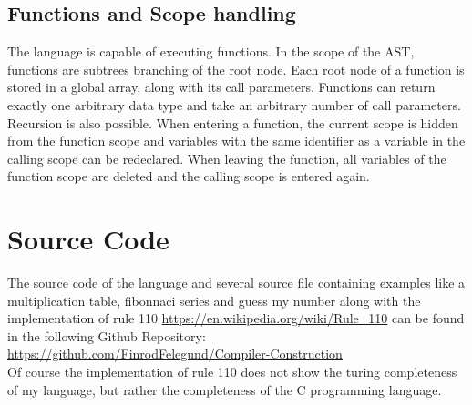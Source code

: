 \documentclass[a4paper, 11pt]{article}
\begin{document}
\subsection{Functions and Scope handling}
The language is capable of executing functions. In the scope of the AST, functions are subtrees branching of the root node. Each root node of a function is stored in a global array, along with its call parameters. Functions can return exactly one arbitrary data type and take an arbitrary number of call parameters. Recursion is also possible. When entering a function, the current scope is hidden from the function scope and variables with the same identifier as a variable in the calling scope can be redeclared. When leaving the function, all variables of the function scope are deleted and the calling scope is entered again.

\section{Source Code}
The source code of the language and several source file containing examples like a multiplication table, fibonnaci series and guess my number along with the implementation of rule 110  \url{https://en.wikipedia.org/wiki/Rule_110} can be found in the following Github Repository: \url{https://github.com/FinrodFelegund/Compiler-Construction}\\
Of course the implementation of rule 110 does not show the turing completeness of my language, but rather the completeness of the C programming language.
\end{document}
